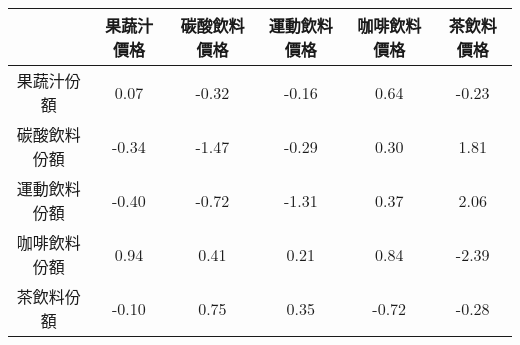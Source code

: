 \begin{tabular}{cccccc}
  \hline
 & 果蔬汁價格 & 碳酸飲料價格 & 運動飲料價格 & 咖啡飲料價格 & 茶飲料價格 \\ 
  \hline
果蔬汁份額 & 0.07 & -0.32 & -0.16 & 0.64 & -0.23 \\ 
  碳酸飲料份額 & -0.34 & -1.47 & -0.29 & 0.30 & 1.81 \\ 
  運動飲料份額 & -0.40 & -0.72 & -1.31 & 0.37 & 2.06 \\ 
  咖啡飲料份額 & 0.94 & 0.41 & 0.21 & 0.84 & -2.39 \\ 
  茶飲料份額 & -0.10 & 0.75 & 0.35 & -0.72 & -0.28 \\ 
   \hline
\end{tabular}
